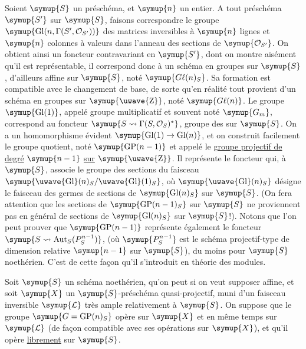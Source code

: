 Soient $\symup{S}$ un préschéma, et $\symup{n}$ un entier. A tout préschéma $\symup{S'}$ sur $\symup{S}$,
faisons correspondre le groupe
$\symup{\operatorname{Gl}(n,\Gamma(S',\mathcal O_{S'}))}$ des matrices inversibles à
$\symup{n}$ lignes et $\symup{n}$ colonnes à valeurs dans l'anneau des sections de
$\symup{\mathcal O_{S'}}$. On obtient ainsi un foncteur contravariant en $\symup{S'}$, dont on
montre aisément qu'il est représentable, il correspond donc à un schéma en
groupes sur $\symup{S}$, d'ailleurs affine sur $\symup{S}$, noté $\symup{G\ell(n)_S}$. Sa
formation est compatible avec le changement de base, de sorte qu'en réalité
tout provient d'un schéma en groupes sur $\symup{\text{\uwave{Z}}}$, noté $\symup{G\ell(n)}$. Le groupe $\symup{\operatorname{Gl}(1)}$, appelé groupe
multiplicatif et souvent noté $\symup{G_m}$, correspond au foncteur
$\symup{S\rightsquigarrow\Gamma(S,\mathcal O_S)^*}$, groupe des  sur $\symup{S}$. On a
un homomorphisme évident $\symup{\operatorname{Gl}(1)\to\operatorname{Gl}(n)}$, et on
construit facilement le groupe quotient, noté $\symup{\operatorname{GP}(n-1)}$ et
appelé le \uline{groupe projectif de degré} $\symup{n-1}$ \uline{sur} $\symup{\text{\uwave{Z}}}$. Il représente
le foncteur qui, à $\symup{S}$, associe le groupe des sections du faisceau
$\symup{\text{\uwave{Gl}}(n)_S/
\text{\uwave{Gl}}(1)_S}$, où
$\symup{\text{\uwave{Gl}}(n)_S}$ désigne le faisceau des germes de sections
de $\symup{\operatorname{Gl}(n)_S}$ sur $\symup{S}$. (On fera attention que les sections de
$\symup{\operatorname{GP}(n-1)_S}$ sur $\symup{S}$ ne proviennent pas en général de sections
de $\symup{\operatorname{Gl}(n)_S}$ sur $\symup{S}$!). Notons que l'on peut prouver que
$\symup{\operatorname{GP}(n-1)}$ représente également le foncteur
$\symup{S\rightsquigarrow\operatorname{Aut}_S(P_S^{n-1})}$, (où
$\symup{P_S^{n-1}}$ est le schéma projectif-type de dimension relative $\symup{n-1}$
sur $\symup{S}$), du moins pour $\symup{S}$ noethérien. C'est de cette façon qu'il s'introduit
en théorie des modules.

Soit $\symup{S}$ un schéma noethérien, qu'on peut si on veut supposer affine, et soit
$\symup{X}$ un $\symup{S}$-préschéma quasi-projectif, muni d'un faisceau inversible $\symup{\mathcal L}$
très ample relativement à $\symup{S}$. On suppose que le groupe
$\symup{G=\operatorname{GP}(n)_S}$ opère sur $\symup{X}$ et en même temps sur $\symup{\mathcal L}$ (de
façon compatible avec ses opérations sur $\symup{X}$), et qu'il opère \uline{librement}
sur $\symup{S}$.


